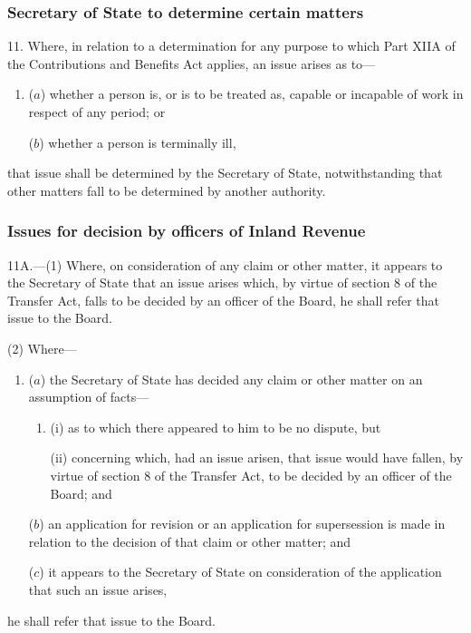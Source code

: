 \documentclass[12pt,a4paper]{article}
\begin{document}
\subsubsection[11. Secretary of State to determine certain matters]{Secretary of State to determine certain matters}

11.  Where, in relation to a determination for any purpose to which Part XIIA of the Contributions and Benefits Act applies, an issue arises as to—
\begin{enumerate}\item[]
($a$) whether a person is, or is to be treated as, capable or incapable of work in respect of any period; or

($b$) whether a person is terminally ill,
\end{enumerate}
that issue shall be determined by the Secretary of State, notwithstanding that other matters fall to be determined by another authority.

\subsubsection[11A. Issues for decision by officers of Inland Revenue]{Issues for decision by officers of Inland Revenue}

11A.---(1)  Where, on consideration of any claim or other matter, it appears to the Secretary of State that an issue arises which, by virtue of section 8 of the Transfer Act, falls to be decided by an officer of the Board, he shall refer that issue to the Board.

(2) Where—
\begin{enumerate}\item[]
($a$) the Secretary of State has decided any claim or other matter on an assumption of facts—
\begin{enumerate}\item[]
(i) as to which there appeared to him to be no dispute, but

(ii) concerning which, had an issue arisen, that issue would have fallen, by virtue of section 8 of the Transfer Act, to be decided by an officer of the Board; and
\end{enumerate}

($b$) an application for revision or an application for supersession is made in relation to the decision of that claim or other matter; and

($c$) it appears to the Secretary of State on consideration of the application that such an issue arises,
\end{enumerate}
he shall refer that issue to the Board.
\end{document}
